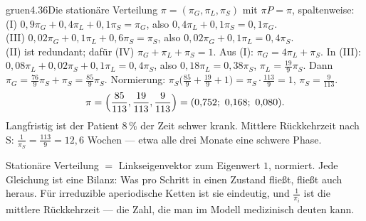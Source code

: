 \begin{loesungkarte}{gruen}{4.36}{Die stationäre Verteilung}
$\pi = (\pi_G, \pi_L, \pi_S)$ mit $\pi P = \pi$, spaltenweise:
(I) $0{,}9\pi_G + 0{,}4\pi_L + 0{,}1\pi_S = \pi_G$, also $0{,}4\pi_L + 0{,}1\pi_S = 0{,}1\pi_G$. \\
(III) $0{,}02\pi_G + 0{,}1\pi_L + 0{,}6\pi_S = \pi_S$, also $0{,}02\pi_G + 0{,}1\pi_L = 0{,}4\pi_S$. \\
(II) ist redundant; dafür (IV) $\pi_G + \pi_L + \pi_S = 1$.
Aus (I): $\pi_G = 4\pi_L + \pi_S$. In (III): $0{,}08\pi_L + 0{,}02\pi_S + 0{,}1\pi_L = 0{,}4\pi_S$, also $0{,}18\pi_L = 0{,}38\pi_S$, $\pi_L = \frac{19}9\pi_S$. Dann $\pi_G = \frac{76}9\pi_S + \pi_S = \frac{85}9\pi_S$. Normierung: $\pi_S\bigl(\frac{85}9 + \frac{19}9 + 1\bigr) = \pi_S\cdot\frac{113}9 = 1$, $\pi_S = \frac9{113}$.
\[ \pi = \Bigl(\frac{85}{113}, \frac{19}{113}, \frac9{113}\Bigr) = (0{,}752;\ 0{,}168;\ 0{,}080). \]
Langfristig ist der Patient $8\,\%$ der Zeit schwer krank. Mittlere Rückkehrzeit nach S: $\frac1{\pi_S} = \frac{113}9 = 12{,}6$ Wochen --- etwa alle drei Monate eine schwere Phase.
\begin{mitnehmen}\kastentext
Stationäre Verteilung $=$ Linkseigenvektor zum Eigenwert $1$, normiert. Jede Gleichung ist eine Bilanz: Was pro Schritt in einen Zustand fließt, fließt auch heraus. Für irreduzible aperiodische Ketten ist sie eindeutig, und $\frac1{\pi_i}$ ist die mittlere Rückkehrzeit --- die Zahl, die man im Modell medizinisch deuten kann.
\end{mitnehmen}
\end{loesungkarte}


